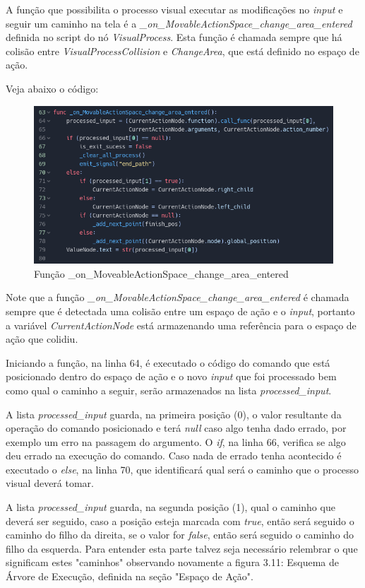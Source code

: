 A função que possibilita o processo visual executar as modificações no 
\textit{input} e seguir um caminho na tela é a
\textit{\_on\_MovableActionSpace\_change\_area\_entered} definida no script do
nó \textit{VisualProcess}. Esta função é chamada sempre que há colisão entre 
\textit{VisualProcessCollision} e \textit{ChangeArea}, que está definido no 
espaço de ação.

Veja abaixo o código:

\begin{figure}[H]
    \includegraphics[width=\textwidth]{../figuras/codigo_MovableActionSpace_area_entered.png}
    \caption{Função \_on\_MoveableActionSpace\_change\_area\_entered}
\end{figure}

Note que a função \textit{\_on\_MovableActionSpace\_change\_area\_entered} é 
chamada sempre que é detectada uma colisão entre um espaço de ação e o 
\textit{input}, portanto a variável \textit{CurrentActionNode} está armazenando
uma referência para o espaço de ação que colidiu.

Iniciando a função, na linha 64,
é executado o código do comando que está posicionado dentro do espaço de ação
e o novo \textit{input} que foi processado bem como qual o caminho a seguir,
serão armazenados na lista \textit{processed\_input}.

A lista \textit{processed\_input} guarda, na primeira posição (0), o valor 
resultante da operação do comando posicionado e terá \textit{null} caso algo
tenha dado errado, por exemplo um erro na passagem do argumento. O \textit{if},
na linha 66, verifica se algo deu errado na execução do comando. Caso nada
de errado tenha acontecido é executado o \textit{else}, na linha 70, que
identificará qual será o caminho que o processo visual deverá tomar.

A lista \textit{processed\_input} guarda, na segunda posição (1), qual o
caminho que deverá ser seguido, caso a posição esteja marcada com \textit{true},
então será seguido o caminho do filho da direita, se o valor for \textit{false},
então será seguido o caminho do filho da esquerda. Para entender esta parte
talvez seja necessário relembrar o que significam estes "caminhos" observando 
novamente a figura 3.11: Esquema de Árvore de Execução, definida na seção 
"Espaço de Ação".

